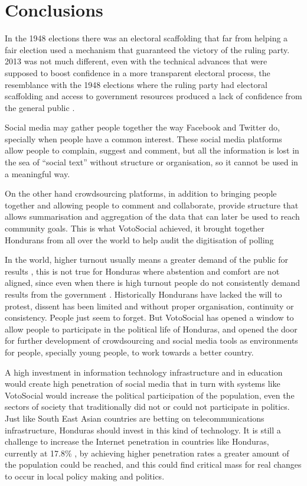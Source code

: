 \documentclass[letterpaper,10pt]{article}
\begin{document}
\section{Conclusions}


In the 1948 elections there was an electoral scaffolding that far from helping a fair election used a mechanism that guaranteed the victory of the ruling party. 2013 was not much different, even with the technical advances that were supposed to boost confidence in a more transparent electoral process, the resemblance with the 1948 elections where the ruling party had electoral scaffolding and access to government resources produced a lack of confidence from the general public \citep{romero2014}.

Social media may gather people together the way Facebook and Twitter do, specially when people have a common interest. These social media platforms allow people to complain, suggest and comment, but all the information is lost in the sea of ``social text'' without structure or organisation, so it cannot be used in a meaningful way.

On the other hand crowdsourcing platforms, in addition to bringing people together and allowing people to comment and collaborate, provide structure that allows summarisation and aggregation of the data that can later be used to reach community goals. This is what VotoSocial achieved, it brought together Hondurans from all over the world to help audit the digitisation of polling 

In the world, higher turnout usually means a greater demand of the public for results \citep{mac2003}, this is not true for Honduras where abstention and comfort are not aligned, since even when there is high turnout people do not consistently demand results from the government \citep{romero2014}. Historically Hondurans have lacked the will to protest, dissent has been limited and without proper organisation, continuity or consistency. People just seem to forget. But VotoSocial has opened a window to allow people to participate in the political life of Honduras, and opened the door for further development of crowdsourcing and social media tools as environments for people, specially young people, to work towards a better country.

A high investment in information technology infrastructure and in education would create high penetration of social media \citep{saadia2014} that in turn with systems like VotoSocial would increase the political participation of the population, even the sectors of society that traditionally did not or could not participate in politics. Just like South East Asian countries are betting on telecommunications infrastructure, Honduras should invest in this kind of technology. It is still a challenge to increase the Internet penetration in countries like Honduras, currently at 17.8\% \citep{webpenet}, by achieving higher penetration rates a greater amount of the population could be reached, and this could find critical mass for real changes to occur in local policy making and politics.
\end{document}
